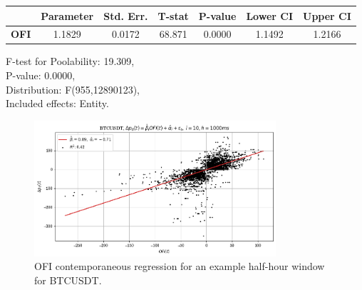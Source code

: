 \documentclass[a4paper, oneside, notitlepage]{book}
\begin{document}
\begin{table}[htbp!]
\begin{center}
\begin{tabular}{lclc}
\hline
\end{tabular}
\begin{tabular}{lcccccc}
             & \textbf{Parameter} & \textbf{Std. Err.} & \textbf{T-stat} & \textbf{P-value} & \textbf{Lower CI} & \textbf{Upper CI}  \\
\hline
\textbf{OFI} &       1.1829       &       0.0172       &      68.871     &      0.0000      &       1.1492      &       1.2166       \\
\hline
\end{tabular}
\end{center}
F-test for Poolability: 19.309, \\
P-value: 0.0000, \\ 
Distribution: F(955,12890123),\\
Included effects: Entity.
\end{table}

\begin{figure}[htpb!]
    \centering
    \includegraphics[width=0.8\textwidth]{./images/btcusdt_h=1000ms_contemp_OFI.png}
    \caption{OFI contemporaneous regression for an example half-hour window for BTCUSDT.}
    \label{fig:contemp_OFI_btcusdt}
\end{figure}

\clearpage
\end{document}
